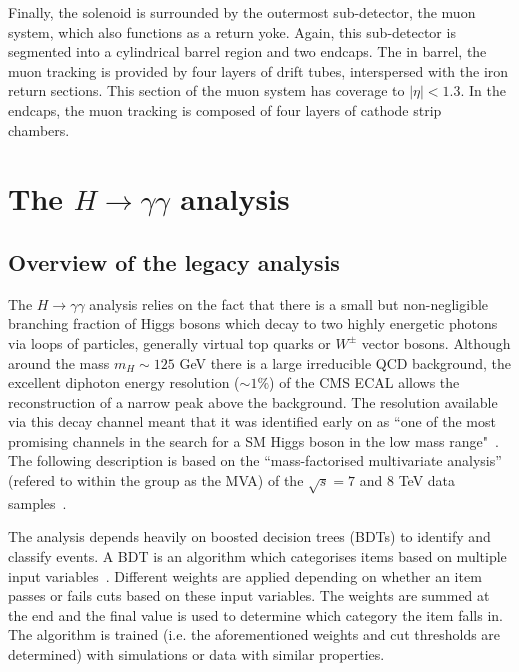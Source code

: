 \documentclass[10pt]{article}
\begin{document}
Finally, the solenoid is surrounded by the outermost sub-detector, the muon system, which also functions as a return yoke. Again, this sub-detector is segmented into a cylindrical barrel region and two endcaps. The in barrel, the muon tracking is provided by four layers of drift tubes, interspersed with the iron return sections. This section of the muon system has coverage to $|\eta| <1.3$. In the endcaps, the muon tracking is composed of four layers of cathode strip chambers.~\cite{cmsMuon}


\section{The $H \rightarrow \gamma \gamma$ analysis}

\subsection{Overview of the legacy analysis}

The $H \rightarrow \gamma \gamma$ analysis relies on the fact that there is a small but non-negligible branching fraction of Higgs bosons which decay to two highly energetic photons via loops of particles, generally virtual top quarks or $W^{\pm}$ vector bosons. Although around the mass $m_H \sim 125$ GeV there is a large irreducible QCD background, the excellent diphoton energy resolution ($\sim 1 \%$) of the CMS ECAL allows the reconstruction of a narrow peak above the background. The resolution available via this decay channel meant that it was identified early on as “one of the most promising channels in the search for a SM Higgs boson in the low mass range"~\cite{Seez}. The following description is based on the ``mass-factorised multivariate analysis'' (refered to within the group as  the MVA) of the $\sqrt{s}=7$ and $8$ TeV data samples~\cite{HDisc}. 

The analysis depends heavily on boosted decision trees (BDTs) to identify and classify events. A BDT is an algorithm which categorises items based on multiple input variables~\cite{BDT}. Different weights are applied depending on whether an item passes or fails cuts based on these input variables. The weights are summed at the end and the final value is used to determine which category the item falls in. The algorithm is trained (i.e. the aforementioned weights and cut thresholds are determined) with simulations or data with similar properties. %
\end{document}
